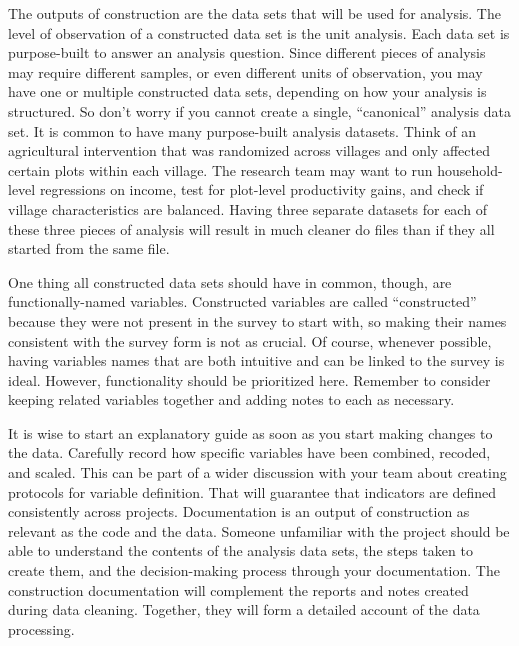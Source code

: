The outputs of construction are the data sets that will be used for analysis.
The level of observation of a constructed data set is the unit analysis. 
Each data set is purpose-built to answer an analysis question.
Since different pieces of analysis may require different samples,
or even different units of observation,
you may have one or multiple constructed data sets, 
depending on how your analysis is structured.
So don't worry if you cannot create a single, ``canonical'' analysis data set.
It is common to have many purpose-built analysis datasets.
Think of an agricultural intervention that was randomized across villages and only affected certain plots within each village. 
The research team may want to run household-level regressions on income, test for plot-level productivity gains, and check if village characteristics are balanced.
Having three separate datasets for each of these three pieces of analysis will result in much cleaner do files than if they all started from the same file. 
 
One thing all constructed data sets should have in common, though, are functionally-named variables.
Constructed variables are called ``constructed'' because they were not present in the survey to start with,
so making their names consistent with the survey form is not as crucial.
Of course, whenever possible, having variables names that are both intuitive and can be linked to the survey is ideal.
However, functionality should be prioritized here.
Remember to consider keeping related variables together and adding notes to each as necessary.

It is wise to start an explanatory guide as soon as you start making changes to the data.
Carefully record how specific variables have been combined, recoded, and scaled. 
This can be part of a wider discussion with your team about creating protocols for variable definition.
That will guarantee that indicators are defined consistently across projects.
Documentation is an output of construction as relevant as the code and the data.
Someone unfamiliar with the project should be able to understand the contents of the analysis data sets, the steps taken to create them, and the decision-making process through your documentation.
The construction documentation will complement the reports and notes created during data cleaning.
Together, they will form a detailed account of the data processing.




